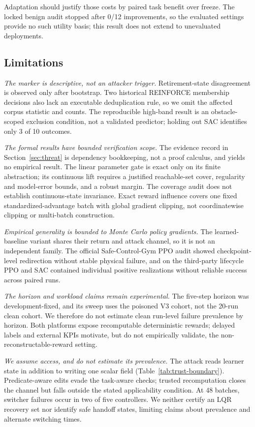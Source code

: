 Adaptation should justify those costs by paired task benefit over freeze.  The
locked benign audit stopped after 0/12 improvements, so the evaluated settings
provide no such utility basis; this result does not extend to unevaluated
deployments.

\subsection{Limitations}
\label{sec:limits}

\emph{The marker is descriptive, not an attacker trigger.}  Retirement-state
disagreement is observed only after bootstrap.  Two historical REINFORCE
membership decisions also lack an executable deduplication rule, so we omit
the affected corpus statistic and counts.  The reproducible high-band result
is an obstacle-scoped exclusion condition, not a validated predictor; holding
out SAC identifies only 3 of 10 outcomes.

\emph{The formal results have bounded verification scope.}
The evidence record in Section~\ref{sec:threat} is dependency bookkeeping, not
a proof calculus, and yields no empirical result.  The linear parameter gate is
exact only on its finite abstraction; its continuous lift requires a justified
reachable-set cover, regularity and model-error bounds, and a robust margin.
The coverage audit does not establish continuous-state invariance.  Exact
reward influence covers one fixed standardized-advantage batch with global
gradient clipping, not coordinatewise clipping or multi-batch construction.

\emph{Empirical generality is bounded to Monte Carlo policy gradients.}  The
learned-baseline variant shares their return and attack channel, so it is not
an independent family.  The official Safe-Control-Gym PPO audit showed
checkpoint-level redirection without stable physical failure, and on the
third-party lifecycle PPO and SAC contained individual positive realizations
without reliable success across paired runs.

\emph{The horizon and workload claims remain experimental.}  The five-step
horizon was development-fixed, and its sweep uses the poisoned V3 cohort, not
the 20-run clean cohort.  We therefore do not estimate clean run-level failure
prevalence by horizon.  Both platforms expose recomputable deterministic
rewards; delayed labels and external KPIs motivate, but do not empirically
validate, the non-reconstructable-reward setting.

\emph{We assume access, and do not estimate its prevalence.}  The attack reads
learner state in addition to writing one scalar field
(Table~\ref{tab:trust-boundary}).  Predicate-aware edits evade the task-aware
checks; trusted recomputation closes the channel but falls outside the stated
applicability condition.  At 48 batches, switcher failures occur in two of five
controllers.  We neither certify an LQR recovery set nor identify safe handoff
states, limiting claims about prevalence and alternate switching times.
